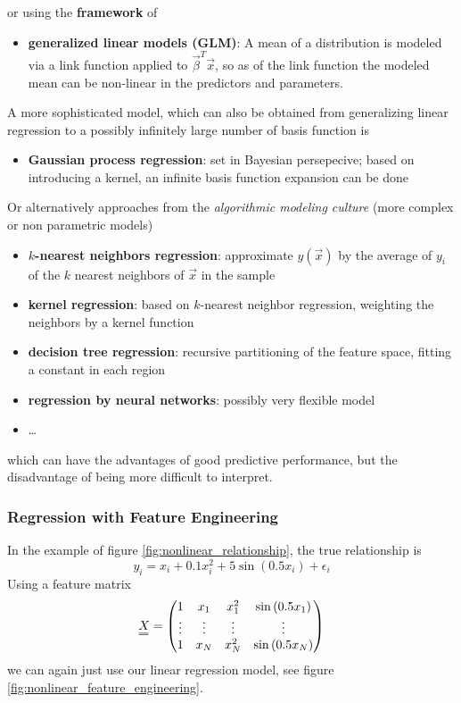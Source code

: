 or using the \textbf{framework} of
\begin{itemize}
    \item \textbf{generalized linear models (GLM)}: A mean of a distribution is modeled via a link function applied to $\vec{\beta}^T \vec{x}$, so as of the link function
    the modeled mean can be non-linear in the predictors and parameters.
\end{itemize}

A more sophisticated model, which can also be obtained from generalizing linear regression
to a possibly infinitely large number of basis function is

\begin{itemize}
    \item \textbf{Gaussian process regression}: set in Bayesian persepecive; based on introducing a kernel, an infinite basis function expansion can be done
\end{itemize}

Or alternatively approaches from the \textit{algorithmic modeling culture} (more complex or
non parametric models)

\begin{itemize}
    \item \textbf{$k$-nearest neighbors regression}: approximate $y(\vec{x})$ by the average of $y_i$ of the $k$ nearest neighbors of $\vec{x}$ in the sample
    \item \textbf{kernel regression}: based on $k$-nearest neighbor regression, weighting the neighbors by a kernel function
    \item \textbf{decision tree regression}: recursive partitioning of the feature space, fitting a constant in each region
    \item \textbf{regression by neural networks}: possibly very flexible model
    \item \dots
\end{itemize}

which can have the advantages of \textcolor{green1}{good predictive performance}, but the disadvantage of
being \textcolor{red1}{more difficult to interpret}.

\subsubsection{Regression with Feature Engineering}
In the example of figure \ref{fig:nonlinear_relationship}, the true relationship is
\begin{equation}
    y_i = x_i + 0.1 x_i^2 + 5 \sin{(0.5 x_i)} + \epsilon_i
\end{equation}
Using a feature matrix
\begin{equation}
    \mat{X} = \begin{pmatrix}
        1 & x_1 & x_1^2 & \sin{(0.5 x_1)} \\
        \vdots & \vdots & \vdots & \vdots \\
        1 & x_N & x_N^2 & \sin{(0.5 x_N)}
    \end{pmatrix}
\end{equation}
we can again just use our linear regression model,
see figure \ref{fig:nonlinear_feature_engineering}.

